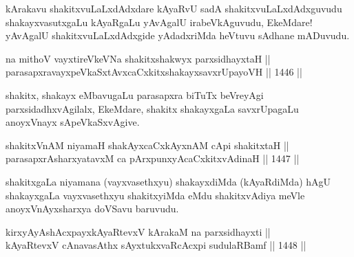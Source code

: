 \begin{artha}
kArakavu shakitxvuLaLxdAdxdare kAyaRvU sadA shakitxvuLaLxdAdxguvudu shakayxvasutxgaLu kAyaRgaLu yAvAgalU irabeVkAguvudu, EkeMdare! yAvAgalU shakitxvuLaLxdAdxgide yAdadxriMda heVtuvu sAdhane mADuvudu.
\end{artha}

\begin{shl}
na mithoV vayxtireVkeVNa shakitxshakwyx parxsidhayxtaH ||  \\
parasapxravayxpeVkaSxtAvxcaCxkitxshakayxsavxrUpayoVH ||  1446 ||  
\end{shl}

\begin{artha}
shakitx, shakayx eMbavugaLu parasapxra biTuTx beVreyAgi parxsidadhxvAgilalx, EkeMdare, shakitx shakayxgaLa savxrUpagaLu anoyxVnayx sApeVkaSxvAgive.
\end{artha}


\begin{shl}
\footnotemark[2]shakitxVnAM niyamaH shakAyxcaCxkAyxnAM cApi shakitxtaH ||  \\
parasapxrAsharxyatavxM ca pArxpunxyAcaCxkitxvAdinaH ||  1447 ||  
\end{shl}

\begin{artha}
shakitxgaLa niyamana (vayxvasethxyu) shakayxdiMda (kAyaRdiMda) hAgU shakayxgaLa vayxvasethxyu shakitxyiMda eMdu shakitxvAdiya meVle anoyxVnAyxsharxya doVSavu baruvudu.
\end{artha}


\begin{shl}
kirxyAyAshAcxpayxkAyaRtevxV kArakaM na parxsidhayxti || \\
kAyaRtevxV cAnavasAthx sAyxtukxvaRcAcxpi sudulaRBamf ||  1448 ||  
\end{shl}

